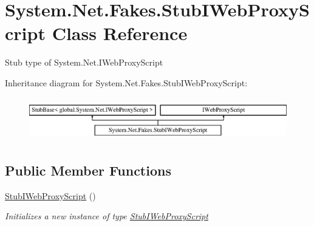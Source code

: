 \hypertarget{class_system_1_1_net_1_1_fakes_1_1_stub_i_web_proxy_script}{\section{System.\-Net.\-Fakes.\-Stub\-I\-Web\-Proxy\-Script Class Reference}
\label{class_system_1_1_net_1_1_fakes_1_1_stub_i_web_proxy_script}
}


Stub type of System.\-Net.\-I\-Web\-Proxy\-Script 


Inheritance diagram for System.\-Net.\-Fakes.\-Stub\-I\-Web\-Proxy\-Script\-:\begin{figure}[H]
\begin{center}
\leavevmode
\includegraphics[height=1.891892cm]{class_system_1_1_net_1_1_fakes_1_1_stub_i_web_proxy_script}
\end{center}
\end{figure}
\subsection*{Public Member Functions}
\begin{DoxyCompactItemize}
\item 
\hyperlink{class_system_1_1_net_1_1_fakes_1_1_stub_i_web_proxy_script_afd5416fe081ac6480f66b882483a2dc9}{Stub\-I\-Web\-Proxy\-Script} ()
\begin{DoxyCompactList}\small\item\em Initializes a new instance of type \hyperlink{class_system_1_1_net_1_1_fakes_1_1_stub_i_web_proxy_script}{Stub\-I\-Web\-Proxy\-Script}\end{DoxyCompactList}\end{DoxyCompactItemize}
